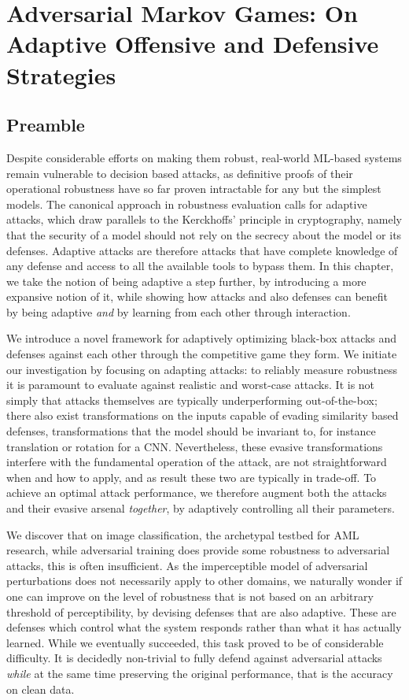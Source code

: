 \chapter{Adversarial Markov Games: On Adaptive Offensive and Defensive Strategies}\label{ch:markovgames}

\section*{Preamble}

Despite considerable efforts on making them robust, real-world ML-based systems remain vulnerable to decision based attacks, as definitive proofs of their operational robustness have so far proven intractable for any but the simplest models.
The canonical approach in robustness evaluation calls for adaptive attacks, which draw parallels to the Kerckhoffs' principle in cryptography, namely that the security of a model should not rely on the secrecy about the model or its defenses. 
Adaptive attacks are therefore attacks that have complete knowledge of any defense and access to all the available tools to bypass them.
In this chapter, we take the notion of being adaptive a step further, by introducing a more expansive notion of it, while showing how attacks and also defenses can benefit by being adaptive \emph{and} by learning from each other through interaction.

We introduce a novel framework for adaptively optimizing black-box attacks and defenses against each other through the competitive game they form.
We initiate our investigation by focusing on adapting attacks: to reliably measure robustness it is paramount to evaluate against realistic and worst-case attacks.
It is not simply that attacks themselves are typically underperforming out-of-the-box; there also exist transformations on the inputs capable of evading similarity based defenses, transformations that the model should be invariant to, for instance translation or rotation for a \gls{CNN}.
Nevertheless, these evasive transformations interfere with the fundamental operation of the attack, are not straightforward when and how to apply, and as result these two are typically in trade-off.
To achieve an optimal attack performance, we therefore augment both the attacks and their evasive arsenal \textit{together}, by adaptively controlling all their parameters.

We discover that on image classification, the archetypal testbed for \gls{AML} research, while adversarial training does provide some robustness to adversarial attacks, this is often insufficient.
As the imperceptible model of adversarial perturbations does not necessarily apply to other domains, we naturally wonder if one can improve on the level of robustness that is not based on an arbitrary threshold of perceptibility, by devising defenses that are also adaptive.
These are defenses which control what the system responds rather than what it has actually learned.
While we eventually succeeded, this task proved to be of considerable difficulty.
It is decidedly non-trivial to fully defend against adversarial attacks \textit{while} at the same time preserving the original performance, that is the accuracy on clean data.

